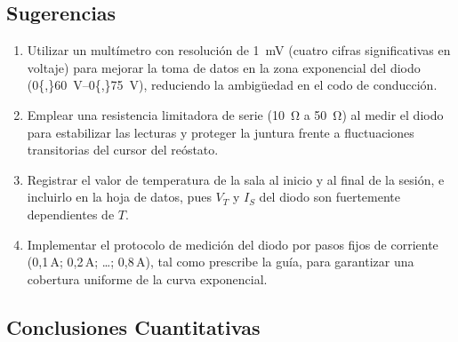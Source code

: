 \subsection{Sugerencias}
\label{sec:sugerencias}

\begin{enumerate}
    \item Utilizar un multímetro con resolución de \qty{1}{\milli\volt} (cuatro cifras significativas en voltaje) para mejorar la toma de datos en la zona exponencial del diodo (\qtyrange{0{,}60}{0{,}75}{\volt}), reduciendo la ambigüedad en el codo de conducción.

    \item Emplear una resistencia limitadora de serie (\qty{10}{\ohm} a \qty{50}{\ohm}) al medir el diodo para estabilizar las lecturas y proteger la juntura frente a fluctuaciones transitorias del cursor del reóstato.

    \item Registrar el valor de temperatura de la sala al inicio y al final de la sesión, e incluirlo en la hoja de datos, pues $V_T$ y $I_S$ del diodo son fuertemente dependientes de $T$.

    \item Implementar el protocolo de medición del diodo por pasos fijos de corriente (0,1\,A; 0,2\,A; \ldots; 0,8\,A), tal como prescribe la guía, para garantizar una cobertura uniforme de la curva exponencial.
\end{enumerate}

\subsection{Conclusiones Cuantitativas}
\label{subsec:conclusiones}

